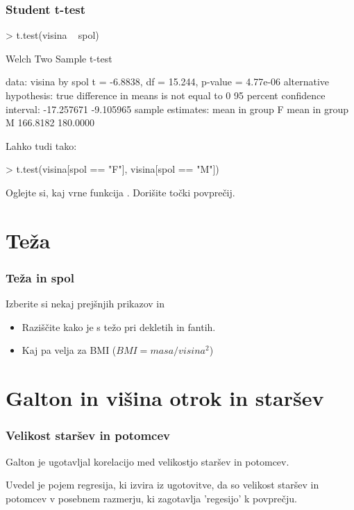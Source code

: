 \begin{frame}[fragile]
\frametitle{Student t-test}
\begin{Schunk}
\begin{Sinput}
> t.test(visina ~ spol)
\end{Sinput}
\begin{Soutput}
	Welch Two Sample t-test

data:  visina by spol 
t = -6.8838, df = 15.244, p-value = 4.77e-06
alternative hypothesis: true difference in means is not equal to 0 
95 percent confidence interval:
 -17.257671  -9.105965 
sample estimates:
mean in group F mean in group M 
       166.8182        180.0000 
\end{Soutput}
\end{Schunk}
Lahko tudi tako:
\begin{Schunk}
\begin{Sinput}
> t.test(visina[spol == "F"], visina[spol == "M"])
\end{Sinput}
\end{Schunk}
Oglejte si, kaj vrne funkcija . Dorišite točki povprečij.
\end{frame}
\clearpage
\section{Teža}
\begin{frame}[fragile]
\frametitle{Teža in spol}
Izberite si nekaj prejšnjih prikazov in
\begin{itemize}
  \item Raziščite kako je s težo pri dekletih in fantih.
  \item Kaj pa velja za BMI ($BMI=masa/visina^2$)
\end{itemize}

\end{frame}


\clearpage
\section{Galton in višina otrok in staršev}
\begin{frame}[fragile]
\frametitle{Velikost staršev in potomcev}
Galton je ugotavljal korelacijo med velikostjo staršev in potomcev.

Uvedel je pojem regresija, ki izvira iz ugotovitve, da so velikost staršev in potomcev v posebnem razmerju, ki zagotavlja 'regesijo' k povprečju.
\end{frame}

